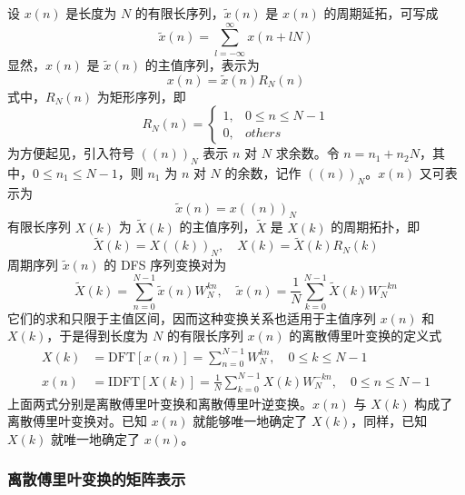 \documentclass[12pt,AutoFakeBold]{article}
\begin{document}
设 $x(n)$ 是长度为 $N$ 的有限长序列，$\tilde{x}(n)$ 是 $x(n)$ 的周期延拓，可写成
%
\begin{equation*}
\tilde{x}(n)=\sum_{l=-\infty}^\infty x(n+lN)
\end{equation*}
% 
显然，$x(n)$ 是 $\tilde{x}(n)$ 的主值序列，表示为
%
\begin{equation*}
x(n)=\tilde{x}(n)R_N(n)
\end{equation*}
%
式中，$R_N(n)$ 为矩形序列，即
%
\begin{equation*}
R_N(n)=\begin{cases}
1,& 0\le n\le N-1 \\
0,& others
\end{cases}
\end{equation*}
%
为方便起见，引入符号 $((n))_N$ 表示 $n$ 对 $N$ 求余数。令 $n=n_1+n_2N$，其中，$0\le n_1\le N-1$，则 $n_1$ 为 $n$ 对 $N$ 的余数，记作 $((n))_N$。$x(n)$ 又可表示为
%
\begin{equation*}
\tilde{x}(n)=x((n))_N
\end{equation*}
%
有限长序列 $X(k)$ 为 $\tilde{X}(k)$ 的主值序列，$\tilde{X}$ 是 $X(k)$ 的周期拓扑，即
%
\begin{equation*}
\tilde{X}(k)=X((k))_N,\quad X(k)=\tilde{X}(k)R_N(k)
\end{equation*}
%
周期序列 $\tilde{x}(n)$ 的 DFS 序列变换对为
%
\begin{equation*}
\tilde{X}(k)=\sum_{n=0}^{N-1}\tilde{x}(n)W_N^{kn},\quad \tilde{x}(n)=\frac{1}{N}\sum_{k=0}^{N-1}\tilde{X}(k)W_N^{-kn}
\end{equation*}
%
它们的求和只限于主值区间，因而这种变换关系也适用于主值序列 $x(n)$ 和 $X(k)$，于是得到长度为 $N$ 的有限长序列 $x(n)$ 的离散傅里叶变换的定义式
%
\begin{align*}
X(k) &= \mathrm{DFT}[x(n)]=\sum_{n=0}^{N-1}W_N^{kn},\quad 0\le k\le N-1 \\
x(n) &= \mathrm{IDFT}[X(k)]=\frac{1}{N}\sum_{k=0}^{N-1}X(k)W_N^{-kn},\quad 0\le n\le N-1
\end{align*}
%
上面两式分别是离散傅里叶变换和离散傅里叶逆变换。$x(n)$ 与 $X(k)$ 构成了离散傅里叶变换对。已知 $x(n)$ 就能够唯一地确定了 $X(k)$，同样，已知 $X(k)$ 就唯一地确定了 $x(n)$。

\subsubsection{离散傅里叶变换的矩阵表示}
\end{document}
